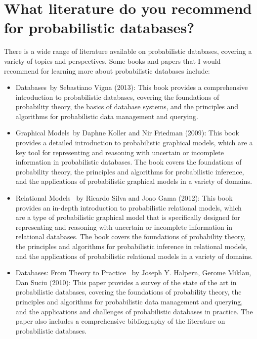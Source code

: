 \chapter{What literature do you recommend for probabilistic databases?}
There is a wide range of literature available on probabilistic databases, covering a variety of topics and perspectives. Some books and papers that I would recommend for learning more about probabilistic databases include:


\begin{itemize}
	\item \Probabilistic Databases\ by Sebastiano Vigna (2013): This book provides a comprehensive introduction to probabilistic databases, covering the foundations of probability theory, the basics of database systems, and the principles and algorithms for probabilistic data management and querying.
	
	\item \Probabilistic Graphical Models\ by Daphne Koller and Nir Friedman (2009): This book provides a detailed introduction to probabilistic graphical models, which are a key tool for representing and reasoning with uncertain or incomplete information in probabilistic databases. The book covers the foundations of probability theory, the principles and algorithms for probabilistic inference, and the applications of probabilistic graphical models in a variety of domains.
	
	\item \Probabilistic Relational Models \ by Ricardo Silva and Joao Gama (2012): This book provides an in-depth introduction to probabilistic relational models, which are a type of probabilistic graphical model that is specifically designed for representing and reasoning with uncertain or incomplete information in relational databases. The book covers the foundations of probability theory, the principles and algorithms for probabilistic inference in relational models, and the applications of probabilistic relational models in a variety of domains.
	
	
	\item \Probabilistic Databases: From Theory to Practice \ by Joseph Y. Halpern, Gerome Miklau, Dan Suciu (2010): This paper provides a survey of the state of the art in probabilistic databases, covering the foundations of probability theory, the principles and algorithms for probabilistic data management and querying, and the applications and challenges of probabilistic databases in practice. The paper also includes a comprehensive bibliography of the literature on probabilistic databases.
	
	

\end{itemize}